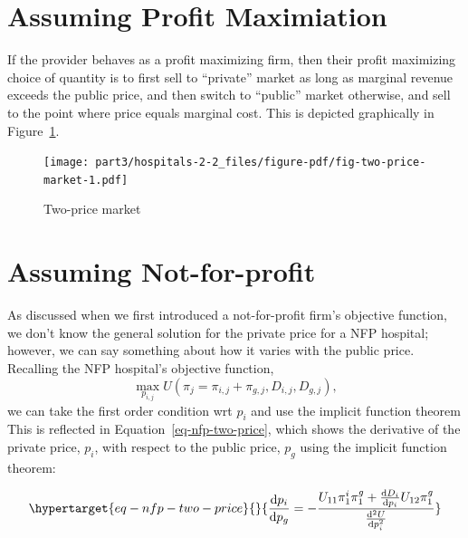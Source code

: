 \documentclass[
  letterpaper,
  DIV=11,
  numbers=noendperiod]{scrreport}
\theoremstyle{definition}
\theoremstyle{remark}
\begin{document}
\hypertarget{assuming-profit-maximiation}{%
\section{Assuming Profit
Maximiation}\label{assuming-profit-maximiation}}

If the provider behaves as a profit maximizing firm, then their profit
maximizing choice of quantity is to first sell to ``private'' market as
long as marginal revenue exceeds the public price, and then switch to
``public'' market otherwise, and sell to the point where price equals
marginal cost. This is depicted graphically in
Figure~\ref{fig-two-price-market}.

\begin{figure}

{\centering \texttt{[image: part3/hospitals-2-2\_files/figure-pdf/fig-two-price-market-1.pdf]}

}

\caption{\label{fig-two-price-market}Two-price market}

\end{figure}

\hypertarget{assuming-not-for-profit}{%
\section{Assuming Not-for-profit}\label{assuming-not-for-profit}}

As discussed when we first introduced a not-for-profit firm's objective
function, we don't know the general solution for the private price for a
NFP hospital; however, we can say something about how it varies with the
public price. Recalling the NFP hospital's objective function,
\[\max_{p_{i,j}} U\left( \pi_{j} = \pi_{i,j} + \pi_{g,j},D_{i,j}, D_{g,j} \right),\]
we can take the first order condition wrt \(p_{i}\) and use the implicit
function theorem This is reflected in Equation~\ref{eq-nfp-two-price},
which shows the derivative of the private price, \(p_{i}\), with respect
to the public price, \(p_{g}\) using the implicit function theorem:

\begin{equation}\protect\hypertarget{eq-nfp-two-price}{}{\frac{\mathrm{d}p_{i}}{\mathrm{d}p_{g}} = - \frac{U_{11}\pi_{1}^{i}\pi_{1}^{g} + \frac{\mathrm{d}D_{i}}{\mathrm{d}p_{i}}U_{12}\pi_{1}^{g}}{\frac{\mathrm{d}^{2}U}{\mathrm{d}p_{i}^{2}}}}\label{eq-nfp-two-price}\end{equation}
\end{document}
